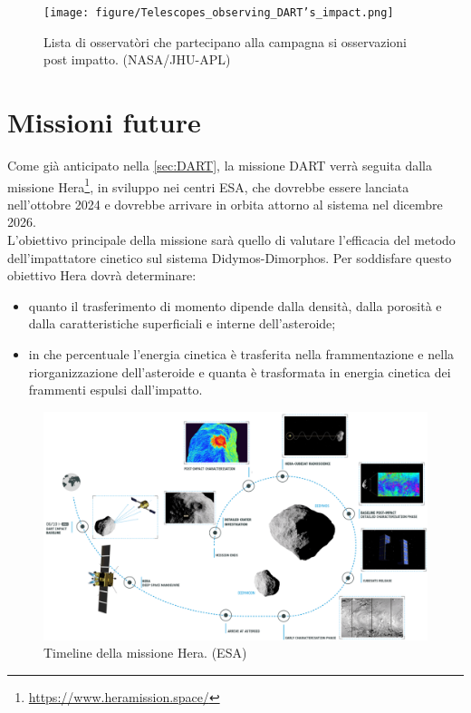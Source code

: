 \documentclass[a4paper,11pt,openright]{book}
\begin{document}
\begin{figure}[!h]
    \centering
    \texttt{[image: figure/Telescopes\_observing\_DART's\_impact.png]}
    \caption[Osservatòri che hanno osservato l'impatto di DART.]{Lista di osservatòri che partecipano alla campagna si osservazioni post impatto. (NASA/JHU-APL)}
    \label{fig:obs_dart}
\end{figure}

\section{Missioni future}\label{sec:hera}
Come già anticipato nella \cref{sec:DART}, la missione DART verrà seguita dalla missione Hera\footnote{\href{https://www.heramission.space/}{https://www.heramission.space/}}, in sviluppo nei centri ESA, che dovrebbe essere lanciata nell'ottobre 2024 e dovrebbe arrivare in orbita attorno al sistema nel dicembre 2026.\\
L'obiettivo principale della missione sarà quello di valutare l'efficacia del metodo dell'impattatore cinetico sul sistema Didymos-Dimorphos. Per soddisfare questo obiettivo Hera dovrà determinare: 
\begin{itemize}
    \item quanto il trasferimento di momento dipende dalla densità, dalla porosità e dalla caratteristiche superficiali e interne dell'asteroide;
    \item in che percentuale l'energia cinetica è trasferita nella frammentazione e nella riorganizzazione dell'asteroide e quanta è trasformata in energia cinetica dei frammenti espulsi dall'impatto.
\end{itemize}

\begin{figure}[!h]
    \centering
    \includegraphics[scale=0.50]{figure/Hera_mission_timeline.png}
    \caption[Timeline della missione Hera.]{Timeline della missione Hera. (ESA)}
    \label{fig:hera_timeline}
\end{figure}
\end{document}
